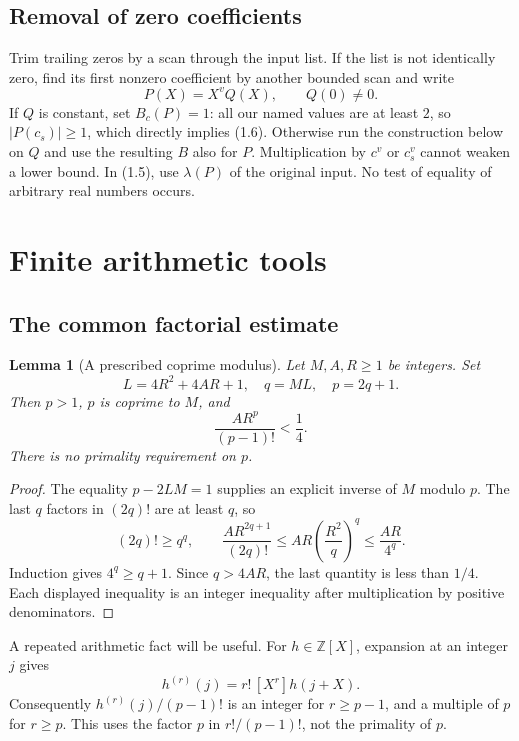 \documentclass[11pt]{article}
\newtheorem{lemma}[theorem]{Lemma}
\theoremstyle{definition}
\newcommand{\Z}{\mathbb Z}
\begin{document}
\subsection{Removal of zero coefficients}

Trim trailing zeros by a scan through the input list. If the list is not
identically zero, find its first nonzero coefficient by another bounded
scan and write
\[
 P(X)=X^vQ(X),\qquad Q(0)\ne0.
\]
If \(Q\) is constant, set \(B_c(P)=1\): all our named values are at least
\(2\), so \(|P(c_s)|\ge1\), which directly implies (1.6).
Otherwise run the construction below on \(Q\)
and use the resulting \(B\) also for \(P\). Multiplication by \(c^v\)
or \(c_s^v\) cannot weaken a lower bound. In (1.5), use \(\lambda(P)\)
of the original input. No test of equality of arbitrary real numbers
occurs.

\section{Finite arithmetic tools}\label{sec:finite}

\subsection{The common factorial estimate}

\begin{lemma}[A prescribed coprime modulus]\label{lem:modulus}
Let \(M,A,R\ge1\) be integers. Set
\[
 L=4R^2+4AR+1,\quad q=ML,\quad p=2q+1.
 \tag{2.1}
\]
Then \(p>1\), \(p\) is coprime to \(M\), and
\[
 \frac{AR^p}{(p-1)!}<\frac14.
 \tag{2.2}
\]
There is no primality requirement on \(p\).
\end{lemma}
\begin{proof}
The equality \(p-2LM=1\) supplies an explicit inverse of \(M\) modulo
\(p\). The last \(q\) factors in \((2q)!\) are at least \(q\), so
\[
 (2q)!\ge q^q,\qquad
 \frac{AR^{2q+1}}{(2q)!}
 \le AR\left(\frac{R^2}{q}\right)^q
 \le \frac{AR}{4^q}.
\]
Induction gives \(4^q\ge q+1\). Since \(q>4AR\), the last quantity
is less than \(1/4\). Each displayed inequality is an integer inequality
after multiplication by positive denominators.
\end{proof}

A repeated arithmetic fact will be useful. For \(h\in\Z[X]\),
expansion at an integer \(j\) gives
\[
 h^{(r)}(j)=r!\,[X^r]h(j+X).
 \tag{2.3}
\]
Consequently \(h^{(r)}(j)/(p-1)!\) is an integer for \(r\ge p-1\),
and a multiple of \(p\) for \(r\ge p\).
This uses the factor \(p\) in \(r!/(p-1)!\), not the primality of \(p\).
\end{document}
